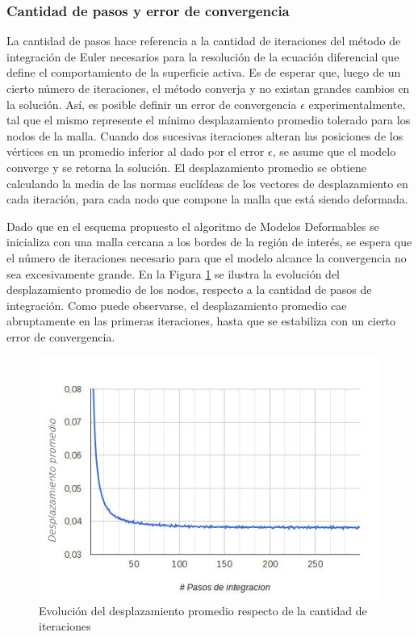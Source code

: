 \subsubsection{Cantidad de pasos y error de convergencia}
La cantidad de pasos hace referencia a la cantidad de iteraciones del método de integración de Euler necesarios para la resolución de la ecuación diferencial que define el comportamiento de la superficie activa. Es de esperar que, luego de un cierto número de iteraciones, el método converja y no existan grandes cambios en la solución. Así, es posible definir un error de convergencia $\epsilon$ experimentalmente, tal que el mismo represente el mínimo desplazamiento promedio tolerado para los nodos de la malla. Cuando dos sucesivas iteraciones alteran las posiciones de los vértices en un promedio inferior al dado por el error $\epsilon$, se asume que el modelo converge y se retorna la solución. El desplazamiento promedio se obtiene calculando la media de las normas euclídeas de los vectores de desplazamiento en cada iteración, para cada nodo que compone la malla que está siendo deformada.

Dado que en el esquema propuesto el algoritmo de Modelos Deformables se inicializa con una malla cercana a los bordes de la región de interés, se espera que el número de iteraciones necesario para que el modelo alcance la convergencia no sea excesivamente grande. En la Figura \ref{fig:convergencia_snakes} se ilustra la evolución del desplazamiento promedio de los nodos, respecto a la cantidad de pasos de integración. Como puede observarse, el desplazamiento promedio cae abruptamente en las primeras iteraciones, hasta que se estabiliza con un cierto error de convergencia.

\begin{figure}[H]
	\centering
	\includegraphics[scale=0.5]{images/convergencia_snakes.jpg}
	\caption{Evolución del desplazamiento promedio respecto de la cantidad de iteraciones}
	\label{fig:convergencia_snakes}
\end{figure}

